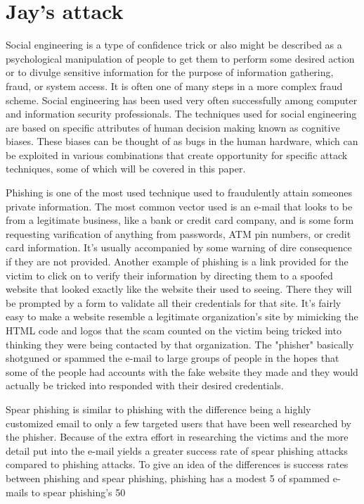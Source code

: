 \section{Jay's attack}

Social engineering is a type of confidence trick or also might be described as a psychological manipulation of people to get them to perform some desired action or to
divulge sensitive information for the purpose of information gathering, fraud, or system access. It is often one of many steps in a more complex fraud scheme.
Social engineering has been used very often successfully among computer and information security professionals.
The techniques used for social engineering are based on specific attributes of human decision making known as cognitive biases. These biases can be thought of as bugs
in the human hardware, which can be exploited in various combinations that create opportunity for specific attack techniques, some of which will be covered in this
paper. 

Phishing is one of the most used technique used to fraudulently attain someones private information. The most common vector used is an e-mail that looks to be from a
legitimate business, like a bank or credit card company, and is some form requesting varification of anything from passwords, ATM pin numbers, or credit card
information. It's usually accompanied by some warning of dire consequence if they are not provided. Another example of phishing is a link provided for the victim to
click on to verify their information by directing them to a spoofed website that looked exactly like the website their used to seeing. There they will be prompted by
a form to validate all their credentials for that site. It's fairly easy to make a website resemble a legitimate organization's site by mimicking the HTML code and
logos that the scam counted on the victim being tricked into thinking they were being contacted by that organization. The "phisher" basically shotguned or spammed
the e-mail to large groups of people in the hopes that some of the people had accounts with the fake website they made and they would actually be tricked into
responded with their desired credentials.

Spear phishing is similar to phishing with the difference being a highly customized email to only a few targeted users that have been well researched by the phisher.
Because of the extra effort in researching the victims and the more detail put into the e-mail yields a greater success rate of spear phishing attacks compared to
phishing attacks. To give an idea of the differences is success rates between phishing and spear phishing, phishing has a modest 5%
of spammed e-mails to spear phishing's 50%

